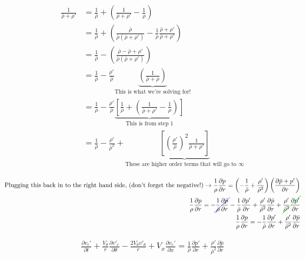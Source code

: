 \begin{align*}
\frac{1}{\bar{\rho} + \rho'} 
&= \frac{1}{\bar{\rho}} 
+ \left(
\frac{1}{\bar{\rho} 
	+ \rho'} 
- \frac{1}{\rho}
\right) \\
&= \frac{1}{\bar{\rho}} 
+ \left(
\frac{\bar{\rho}}{\bar{\rho}(\bar{\rho} 
	+ \rho')} 
- \frac{1}{\rho} \frac{\bar{\rho} + \rho'}{\bar{\rho} + \rho'}
\right) \\
&= \frac{1}{\bar{\rho}} 
- \left(
\frac{\bar{\rho} - \bar{\rho} + \rho'}{\bar{\rho}(\bar{\rho} 
	+ \rho')}
\right)	\\
&= \frac{1}{\bar{\rho}} 
- \frac{\rho'}{\bar{\rho}}
\underbrace{\left(
	\frac{1}{\bar{\rho} + \rho}
	\right)}_\text{This is what we're solving for!}	\\
&= \frac{1}{\bar{\rho}} 
- \frac{\rho'}{\bar{\rho}}
\underbrace{
	\left[\frac{1}{\bar{\rho}} 
	+ \left(
	\frac{1}{\bar{\rho} 
		+ \rho'} 
	- \frac{1}{\rho}
	\right) \right] }_\text{This is from step 1}	\\
&= \frac{1}{\bar{\rho}} 
- \frac{\rho'}{\bar{\rho}^2} +
\underbrace{
	\left[ \left(\frac{\rho'}{\bar{\rho}}\right)^2
	\frac{1}{\bar{\rho} 
		+ \rho'} 
	\right] }_\text{These are higher order terms that will go to $\infty$}	\\	
\end{align*}
\begin{align*}
\text{Plugging this back in to the right hand side, (don't forget the negative!)} \rightarrow
\frac{1}{\rho}\frac{\partial p}{\partial r} = \left( -\frac{1    }{\bar{\rho}} +
\frac{\rho'}{\bar{\rho}^2}\right) \left(\frac{\partial \bar{p} + p'}{\partial r}\right)\\
\frac{1}{\rho}\frac{\partial p}{\partial r} =  -\Ccancel[blue]{\frac{1    }{\bar{\rho}}  \frac{\partial \bar{p}}{\partial r}} -  
\frac{1    }{\bar{\rho}}  \frac{\partial p'}{\partial r} +
\frac{\rho'}{\bar{\rho}^2}\frac{\partial \bar{p}}{\partial r} +
\Ccancel[green]{\frac{\rho'}{\bar{\rho}^2}\frac{\partial p'}{\partial r}}\\
\frac{1}{\rho}\frac{\partial p}{\partial r} =  -\frac{1    }{\bar{\rho}}  \frac{\partial p'}{\partial r} +
\frac{\rho'}{\bar{\rho}^2}\frac{\partial \bar{p}}{\partial r} 
\end{align*}

\begin{align*}
\boxed{
	\frac{\partial  v_r' }{\partial t} +
	\frac{V_{\theta}}{r} \frac{\partial v'_r}{\partial \theta} -
	\frac{2V_{\theta}v'_{\theta}}{r} +
	V_x \frac{\partial v_r'}{\partial x} =\frac{1    }{\bar{\rho}}  \frac{\partial p'}{\partial r} +
	\frac{\rho'}{\bar{\rho}^2}\frac{\partial \bar{p}}{\partial r} 
}
\end{align*}
\newpage
